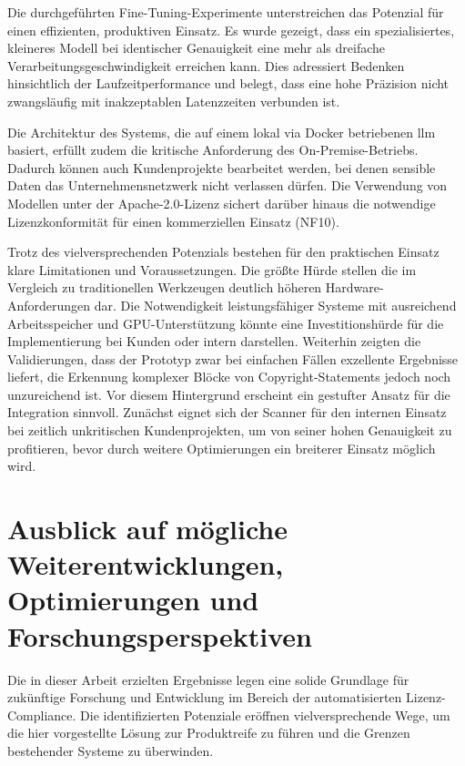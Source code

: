 Die durchgeführten Fine-Tuning-Experimente unterstreichen das Potenzial für einen effizienten, produktiven Einsatz.
Es wurde gezeigt, dass ein spezialisiertes, kleineres Modell bei identischer Genauigkeit eine mehr als dreifache Verarbeitungsgeschwindigkeit erreichen kann.
Dies adressiert Bedenken hinsichtlich der Laufzeitperformance und belegt, dass eine hohe Präzision nicht zwangsläufig mit inakzeptablen Latenzzeiten verbunden ist.

Die Architektur des Systems, die auf einem lokal via Docker betriebenen \gls{llm} basiert, erfüllt zudem die kritische Anforderung des On-Premise-Betriebs.
Dadurch können auch Kundenprojekte bearbeitet werden, bei denen sensible Daten das Unternehmensnetzwerk nicht verlassen dürfen.
Die Verwendung von Modellen unter der Apache-2.0-Lizenz sichert darüber hinaus die notwendige Lizenzkonformität für einen kommerziellen Einsatz (NF10).

Trotz des vielversprechenden Potenzials bestehen für den praktischen Einsatz klare Limitationen und Voraussetzungen.
Die größte Hürde stellen die im Vergleich zu traditionellen Werkzeugen deutlich höheren Hardware-Anforderungen dar.
Die Notwendigkeit leistungsfähiger Systeme mit ausreichend Arbeitsspeicher und GPU-Unterstützung könnte eine Investitionshürde für die Implementierung bei Kunden oder intern darstellen.
Weiterhin zeigten die Validierungen, dass der Prototyp zwar bei einfachen Fällen exzellente Ergebnisse liefert, die Erkennung komplexer Blöcke von Copyright-Statements jedoch noch unzureichend ist.
Vor diesem Hintergrund erscheint ein gestufter Ansatz für die Integration sinnvoll.
Zunächst eignet sich der Scanner für den internen Einsatz bei zeitlich unkritischen Kundenprojekten, um von seiner hohen Genauigkeit zu profitieren, bevor durch weitere Optimierungen ein breiterer Einsatz möglich wird.


\section{Ausblick auf mögliche Weiterentwicklungen, Optimierungen und Forschungsperspektiven}

Die in dieser Arbeit erzielten Ergebnisse legen eine solide Grundlage für zukünftige Forschung und Entwicklung im Bereich der automatisierten Lizenz-Compliance.
Die identifizierten Potenziale eröffnen vielversprechende Wege, um die hier vorgestellte Lösung zur Produktreife zu führen und die Grenzen bestehender Systeme zu überwinden.

